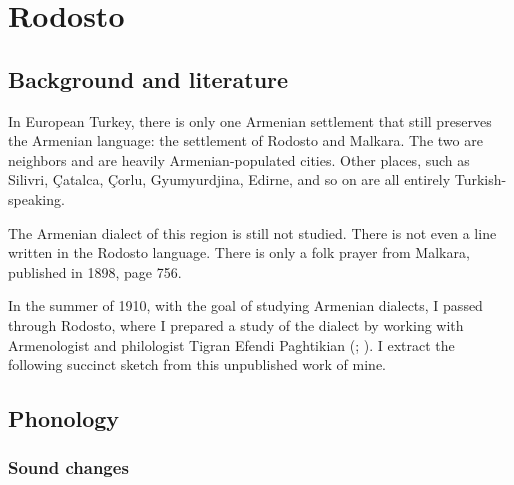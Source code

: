 
\fussy

\chapter{Rodosto}\label{chapter:Rodosto}

\section{Background and literature}

\begin{adjarianpage}\label{page:258}\end{adjarianpage}%

In European Turkey, there is only one Armenian settlement that still preserves the Armenian language: the settlement of Rodosto and Malkara. The two are neighbors and are heavily Armenian\hyp populated cities. Other places, such as Silivri, Çatalca, Çorlu, Gyumyurdjina, Edirne, and so on are all entirely Turkish-speaking.


The Armenian dialect of this region is still not studied. There is not even a line written in the Rodosto language. There is only a folk prayer from Malkara, published in  1898, page 756. 

In the summer of 1910, with the goal of studying Armenian dialects, I passed through Rodosto, where I prepared a study of the dialect by working with Armenologist and philologist Tigran Efendi Paghtikian (; ). I extract the following succinct sketch from this unpublished work of mine. 

\section{Phonology}
\subsection{Sound changes}
